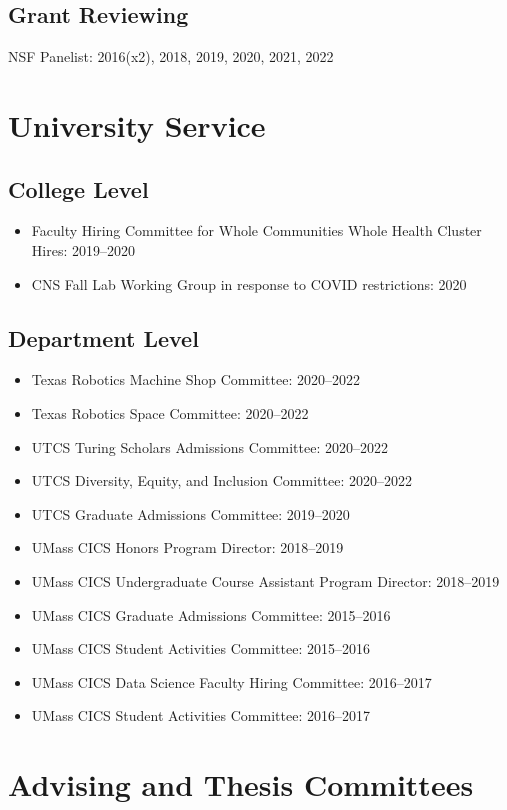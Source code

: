 \documentclass[Times]{article}
\begin{document}
\subsection*{Grant Reviewing}

NSF Panelist: 2016(x2), 2018, 2019, 2020, 2021, 2022


\section*{University Service}
\subsection*{College Level}
\begin{itemize}
  \item Faculty Hiring Committee for Whole Communities Whole Health Cluster
    Hires: 2019--2020
  \item CNS Fall Lab Working Group in response to COVID restrictions: 2020
\end{itemize}

\subsection*{Department Level}
\begin{itemize}
 \item Texas Robotics Machine Shop Committee: 2020--2022
 \item Texas Robotics Space Committee: 2020--2022
 \item UTCS Turing Scholars Admissions Committee: 2020--2022
 \item UTCS Diversity, Equity, and Inclusion Committee: 2020--2022
 \item UTCS Graduate Admissions Committee: 2019--2020
 \item UMass CICS Honors Program Director: 2018--2019
 \item UMass CICS Undergraduate Course Assistant Program Director: 2018--2019
 \item UMass CICS Graduate Admissions Committee: 2015--2016
 \item UMass CICS Student Activities Committee: 2015--2016
 \item UMass CICS Data Science Faculty Hiring Committee: 2016--2017
 \item UMass CICS Student Activities Committee: 2016--2017
\end{itemize}

\section*{Advising and Thesis Committees}
\end{document}
